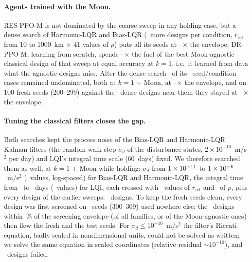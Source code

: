 \documentclass[11pt,a4paper]{article}
\begin{document}
\paragraph{Agents trained with the Moon.} RES-PPO-M is not dominated by the
coarse sweep in any holding case, but a dense search of Harmonic-LQR and
Bias-LQR (\moDenseDesigns\ more designs per condition, $r_\text{ref}$ from 10
to 1000~km $\times$ 41 values of $\rho$) puts all its seeds at
\moResmEnvMin--\moResmEnvMax$\times$ the envelope. DR-PPO-M, learning from
scratch, spends \moDrmAgnMin--\moDrmAgnMax$\times$ the fuel of the best
Moon-agnostic classical design of that sweep at equal accuracy at $k = 1$,
i.e.\ it learned from data what the agnostic designs miss. After the dense
search \moDrmDenseNd\ of its \moDrmDenseOf\ seed/condition cases remained
undominated, both at $k = 1$ + Moon, at
\moDrmDenseEnvMin--\moDrmDenseEnvMax$\times$ the envelope, and on 100 fresh
seeds (200--299) against the \moConfDesigns\ dense designs near them they
stayed at \moConfEnvMin--\moConfEnvMax$\times$ the envelope.

\paragraph{Tuning the classical filters closes the gap.} Both searches kept the
process noise of the Bias-LQR and Harmonic-LQR Kalman filters (the
random-walk step $\sigma_d$ of the disturbance states,
$2\times10^{-10}$~m/s$^2$ per day) and LQI's integral time scale (60~days)
fixed. We therefore searched them as well, at $k = 1$ + Moon while holding:
$\sigma_d$ from $1\times10^{-11}$ to $1\times10^{-6}$~m/s$^2$ (\kThreeNBw\ values,
log-spaced) for Bias-LQR and Harmonic-LQR, the integral time from
\kThreeTintMin\ to \kThreeTintMax~days (\kThreeNTint\ values) for LQI, each
crossed with \kThreeNRref\ values of $r_\text{ref}$ and \kThreeNRho\ of $\rho$,
plus every design of the earlier sweeps: \kThreeDesigns\ designs. To keep the
fresh seeds clean, every design was first screened on \kThreeNScreen\ seeds
(300--309) used nowhere else; the \kThreeFinal\ designs within
\kThreeMargin\,\% of the screening envelope (of all families, or of the
Moon-agnostic ones) then flew the fresh and the test seeds. For
$\sigma_d \le 10^{-10}$~m/s$^2$ the filter's Riccati equation, badly scaled in
nondimensional units, could not be solved as written; we solve the same
equation in scaled coordinates (relative residual $\sim 10^{-10}$), and
\kThreeFailed\ designs failed.
\end{document}
